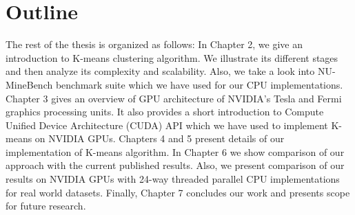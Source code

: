\section{Outline}
The rest of the thesis is organized as follows: In Chapter 2, we give an introduction to K-means clustering algorithm. We illustrate its different stages and then analyze its complexity and scalability. Also, we take a look into NU-MineBench benchmark suite \cite{numine} which we have used for our CPU implementations. Chapter 3 gives an overview of GPU architecture of NVIDIA's Tesla and Fermi graphics processing units. It also provides a short introduction to Compute Unified Device Architecture (CUDA) API which we have used to implement K-means on NVIDIA GPUs. Chapters 4 and 5 present details of our implementation of K-means algorithm. In Chapter 6 we show comparison of our approach with the current published results. Also, we present comparison of our results on NVIDIA GPUs with 24-way threaded parallel CPU implementations for real world datasets. Finally, Chapter 7 concludes our work and presents scope for future research.